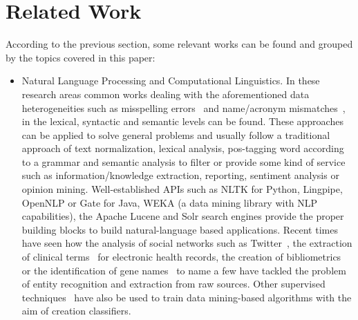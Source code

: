 \documentclass{llncs}
\begin{document}
\section{Related Work}
According to the previous section, some relevant works can be found and grouped by the topics covered in this paper:
\begin{itemize}
 \item Natural Language Processing and Computational Linguistics. In these research areas common works dealing with the aforementioned data heterogeneities 
   such as misspelling errors~\cite{NorvigSpelling,StanfordSpelling} and name/acronym mismatches~\cite{Yeates99automaticextraction}, 
  in the lexical, syntactic and semantic levels can be found. These approaches can be applied to solve general problems and usually follow a 
  traditional approach of text normalization, lexical analysis, pos-tagging word according to a grammar and semantic analysis to filter or 
  provide some kind of service such as information/knowledge extraction, reporting, sentiment analysis or opinion mining. 
  Well-established APIs such as NLTK for Python, Lingpipe, OpenNLP or Gate for Java, WEKA 
  (a data mining library with NLP capabilities), the Apache Lucene and Solr search engines provide the proper building blocks to build natural-language based applications. 
  Recent times have seen how the analysis of social networks such as Twitter~\cite{Li:2012:TNE:2348283.2348380}, the extraction of 
  clinical terms~\cite{Wang:2009:ARN:1667884.1667888} for electronic health records, the creation of bibliometrics~\cite{Galvez2006} or 
  the identification of gene names~\cite{Krauthammer:2004:TIB:1053007.1053018,Galvez2012} to name a few have tackled the problem of entity recognition and extraction from raw sources. 
  Other supervised techniques~\cite{Bohn:2006:PHD} have also be used to train data mining-based algorithms with the aim of creation classifiers.
 

\end{itemize}
\end{document}
